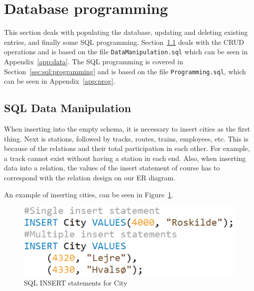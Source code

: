 \section{Database programming}\label{sec:prog}
This section deals with populating the database, updating and deleting existing 
entries, and finally some SQL programming. Section~\ref{sec:manipulate} deals 
with the CRUD operations and is based on the file \verb|DataManipulation.sql| 
which can be seen in Appendix~\ref{app:data}. The SQL programming is covered in 
Section~\ref{sec:sql:programming} and is based on the file 
\verb|Programming.sql|, which can be seen in Appendix~\ref{app:prog}.

\subsection{SQL Data Manipulation} \label{sec:manipulate}
When inserting into the empty schema, it is necessary to insert cities as the 
first thing. Next is stations, followed by tracks, routes, trains, employees, 
etc. This is because of the relations and their total participation in each 
other. For example, a track cannot exist without having a station in each 
end.
Also, when inserting data into a relation, the values of the insert statement 
of course has to correspond with the relation design on our ER diagram.

An example of inserting cities, can  be seen in Figure~\ref{fig:ins:city}.



\begin{figure}[ht!]
    \centering
    \includegraphics[scale=.5]{img/INSERT_Statements}
    \caption{SQL INSERT statements for City}
    \label{fig:ins:city}
\end{figure}

